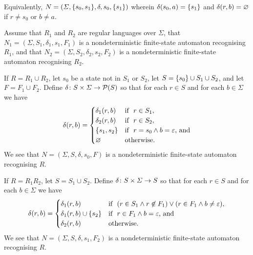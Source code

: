     \noindent Equivalently, \(N = (\varSigma, \{s_0, s_1\}, \delta, s_0,
    \{s_1\})\) wherein \(\delta(s_0, a) = \{s_1\}\) and \(\delta(r, b) =
    \varnothing\) if \(r \neq s_0\) or \(b \neq a\).

    Assume that \(R_1\) and \(R_2\) are regular languages over \(\varSigma\),
    that \(N_1 = (\varSigma, S_1, \delta_1, s_1, F_1)\) is a nondeterministic
    finite-state automaton recognising \(R_1\), and that \(N_2 = (\varSigma,
    S_2, \delta_2, s_2, F_2)\) is a nondeterministic finite-state automaton
    recognising \(R_2\).

    If \(R = R_1 \cup R_2\), let \(s_0\) be a state not in \(S_1\) or \(S_2\),
    let \(S = \{s_0\} \cup S_1 \cup S_2\), and let \(F = F_1 \cup F_2\).
    Define \(\delta\colon S \times \varSigma\to\mathcal{P}(S)\) so that for each \(r
    \in S\) and for each \(b \in \varSigma\) we have
    \[
        \delta(r, b) = \begin{cases}
            \delta_1(r, b) & \text{if }\ r \in S_1,\\
            \delta_2(r, b) & \text{if }\ r \in S_2,\\
            \{s_1, s_2\} & \text{if }\ r = s_0 \land b = \varepsilon \text{,
            and}\\
            \varnothing & \text{otherwise.}
        \end{cases}
    \]
    We see that \(N = (\varSigma, S, \delta, s_0, F)\) is a nondeterministic
    finite-state automaton recognising \(R\).

    If \(R = R_1 R_2\), let \(S = S_1 \cup S_2\). Define \(\delta\colon S \times
    \varSigma\to S\) so that for each \(r \in S\) and for each \(b \in
    \varSigma\) we have
    \[
        \delta(r, b) = \begin{cases}
            \delta_1(r, b) & \text{if }\ (r \in S_1 \land r \not\in F_1) \lor (r
            \in F_1 \land b \neq \varepsilon),\\
            \delta_1(r, b) \cup \{s_2\} & \text{if }\ r \in F_1 \land b =
            \varepsilon \text{, and}\\
            \delta_2(r, b) & \text{otherwise.}
        \end{cases}
    \]
    We see that \(N = (\varSigma, S, \delta, s_1, F_2)\) is a nondeterministic
    finite-state automaton recognising \(R\).

